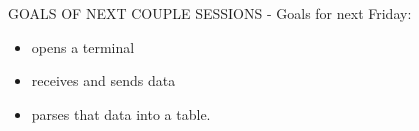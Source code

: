 \documentclass[fontsize=11pt, %
                             paper=letter, %
                             twoside, %
                             captions=tableheading,
                             index=totoc,
                             hyperref]{labbook}
\begin{document}
\begin{addmargin}[0cm]{0cm}
\begin{itemize}
\end{itemize}

GOALS OF NEXT COUPLE SESSIONS - Goals for next Friday:
\begin{itemize}
\item opens a terminal
\item receives and sends data
\item parses that data into a table. 

\end{itemize}



\end{addmargin}









\end{document}
